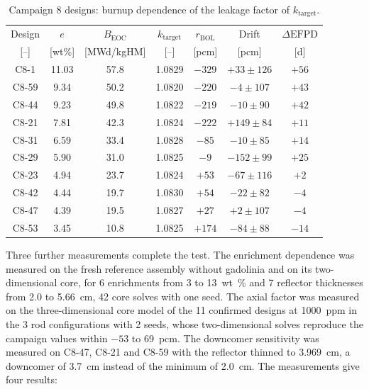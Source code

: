 \begin{table}[htbp]
  \centering
  \small
  \caption{Campaign 8 designs: burnup dependence of the leakage factor of $k_\mathrm{target}$.}
  \label{tab:kt-burnup}
  \begin{tabular}{@{}ccccccc@{}}
    \toprule
    Design & $e$ & $B_\mathrm{EOC}$ & $k_\mathrm{target}$ &
      $r_\mathrm{BOL}$ & Drift & $\Delta\mathrm{EFPD}$ \\
    {[--]} & [wt\%] & [MWd/kgHM] & [--] & [pcm] & [pcm] & [d] \\
    \midrule
    C8-1  & 11.03 & 57.8 & 1.0829 & $-329$ & $+33 \pm 126$  & $+56$ \\
    C8-59 & 9.34  & 50.2 & 1.0820 & $-220$ & $-4 \pm 107$   & $+43$ \\
    C8-44 & 9.23  & 49.8 & 1.0822 & $-219$ & $-10 \pm 90$   & $+42$ \\
    C8-21 & 7.81  & 42.3 & 1.0824 & $-222$ & $+149 \pm 84$  & $+11$ \\
    C8-31 & 6.59  & 33.4 & 1.0828 & $-85$  & $-10 \pm 85$   & $+14$ \\
    C8-29 & 5.90  & 31.0 & 1.0825 & $-9$   & $-152 \pm 99$  & $+25$ \\
    C8-23 & 4.94  & 23.7 & 1.0824 & $+53$  & $-67 \pm 116$  & $+2$ \\
    C8-42 & 4.44  & 19.7 & 1.0830 & $+54$  & $-22 \pm 82$   & $-4$ \\
    C8-47 & 4.39  & 19.5 & 1.0827 & $+27$  & $+2 \pm 107$   & $-4$ \\
    C8-53 & 3.45  & 10.8 & 1.0825 & $+174$ & $-84 \pm 88$   & $-14$ \\
    \bottomrule
  \end{tabular}
\end{table}

Three further measurements complete the test. The enrichment
dependence was measured on the fresh reference assembly without
gadolinia and on its two-dimensional core, for 6 enrichments from 3 to
\SI{13}{wt\%} and 7 reflector thicknesses from 2.0 to \SI{5.66}{cm}, 42
core solves with one seed. The axial factor was measured on the
three-dimensional core model of the 11 confirmed designs at
\SI{1000}{ppm} in the 3 rod configurations with 2 seeds, whose
two-dimensional solves reproduce the campaign values within $-53$ to
\SI{+69}{pcm}. The downcomer sensitivity was measured on C8-47, C8-21
and C8-59 with the reflector thinned to \SI{3.969}{cm}, a downcomer of
\SI{3.7}{cm} instead of the minimum of \SI{2.0}{cm}. The measurements
give four results:


